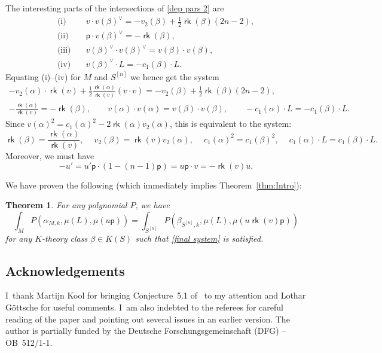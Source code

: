 \documentclass[pdftex]{sigma}
\numberwithin{equation}{section}
\newtheorem{thm}[Theorem]{Theorem}
\newcommand{\pt}{{\mathsf{p}}}
\newcommand{\1}{\mathsf{1}}
\newcommand\rk{\operatorname{\mathsf{rk}}}
\begin{document}
The interesting parts of the intersections of \eqref{dep pars 2} are
\begin{align*}
\text{(i)} \quad   & v \cdot v(\beta)^{\vee} = -v_2(\beta) + \frac{1}{2} \rk(\beta) (2n-2), \\
\text{(ii)} \quad   & \pt \cdot v(\beta)^{\vee} = - \rk(\beta), \\
\text{(iii)} \quad  & v(\beta)^{\vee} \cdot v(\beta)^{\vee} = v(\beta) \cdot v(\beta), \\
\text{(iv)} \quad   & v(\beta)^{\vee} \cdot L = -c_1(\beta) \cdot L.
\end{align*}
Equating (i)--(iv) for $M$ and $S^{[n]}$ we hence get the system
\begin{gather*}
- v_2(\alpha) \cdot \rk(v) + \frac{1}{2} \frac{\rk(\alpha)}{\rk(v)} (v \cdot v)  = -v_2(\beta) + \frac{1}{2} \rk(\beta) (2n-2),
\\
- \frac{\rk(\alpha)}{\rk(v)} =  - \rk(\beta),
\qquad
v(\alpha) \cdot v(\alpha)  = v(\beta) \cdot v(\beta),
\qquad
-c_1(\alpha) \cdot L  = -c_1(\beta) \cdot L.
\end{gather*}
Since $v(\alpha)^2 = c_1(\alpha)^2 - 2 \rk(\alpha) v_2(\alpha)$,
this is equivalent to the system:
\begin{equation} \label{final system}
\rk(\beta)  = \frac{ \rk(\alpha) }{ \rk(v) }, \quad \
v_2(\beta)  = \rk(v) v_2(\alpha), \quad \
c_1(\alpha)^2  = c_1(\beta)^2, \quad \
c_1(\alpha) \cdot L  = c_1(\beta) \cdot L.
\end{equation}
Moreover, we must have
\[ -u' =  u' \pt \cdot (1 - (n-1) \pt) = u \pt \cdot v = - \rk(v) u. \]

We have proven the following (which immediately implies
Theorem~\ref{thm:Intro}):
\begin{thm} For any polynomial $P$, we have
\[
\int_{M} P(\alpha_{M,k}, \mu(L), \mu(u \pt))
=
\int_{S^{[n]}} P(\beta_{S^{[n]},k}, \mu(L), \mu(u \rk(v) \pt))
\]
for any $K$-theory class $\beta \in K(S)$ such that
\eqref{final system} is satisfied.
\end{thm}

\subsection*{Acknowledgements}
I~thank Martijn Kool for bringing Conjecture~5.1 of~\cite{GK} to my attention
and Lothar G\"ottsche for useful comments.
I~am also indebted to the referees for careful reading of the paper and pointing out several issues in an earlier version.
The author is partially funded by the Deutsche Forschungsgemeinschaft (DFG) -- OB~512/1-1.
\end{document}
